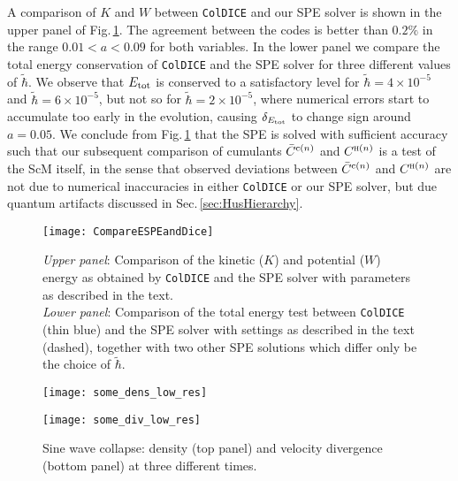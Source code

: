 \documentclass[twocolumn, nofootinbib, showpacs, superscriptaddress]{revtex4-1}
\renewcommand{\H}[0]{{\textsc{h}}}
\newcommand{\thbar}{\tilde\hbar}
\renewcommand{\c}[0]{{\rm{c}}}
\begin{document}
A comparison of $K$ and $W$ between \texttt{ColDICE} and our SPE solver is shown in the upper panel of Fig.\,\ref{fig:CompareESPEandDice}.
The agreement between the codes  is better than $0.2\%$ in the range $0.01<a<0.09$ for both variables.
In the lower panel we compare the total energy conservation of \texttt{ColDICE} and the SPE solver for three different values of $\thbar$. 
We observe that $E_{\rm tot}$ is conserved to a satisfactory level for $\thbar = 4\times10^{-5}$ and $\thbar = 6\times10^{-5}$, but not so for $\thbar = 2\times10^{-5}$, where numerical 
errors start to accumulate too early in the evolution, causing $\delta_{ E_{\rm tot}}$ to change sign around $a=0.05$.
We conclude from Fig.\,\ref{fig:CompareESPEandDice} that the SPE is solved with sufficient accuracy such that our subsequent comparison 
of cumulants $\bar C^{\c (n)}$ and $ C^{\H (n)}$ is a test of the ScM itself, in the sense that observed 
deviations between $\bar C^{\c (n)}$ and $ C^{\H (n)}$ are not due to numerical inaccuracies in either \texttt{ColDICE} or our 
SPE solver, but due quantum artifacts discussed in Sec.\,\ref{sec:HusHierarchy}.

\begin{figure}[t]
    \centering
    \texttt{[image: CompareESPEandDice]}
    \caption{ {\it Upper panel}: Comparison of the kinetic ($K$) and potential ($W$) energy as obtained by \texttt{ColDICE} and the SPE solver with parameters as described in the text. 
 \\
    {\it Lower panel}: Comparison of the total energy test between \texttt{ColDICE} (thin blue) and the SPE solver with settings as described in the text (dashed), together with two other SPE solutions which differ only be the choice of $\thbar$.}
    \label{fig:CompareESPEandDice}
\end{figure} 
  


\FloatBarrier
\begin{figure*}[!]
\texttt{[image: some\_dens\_low\_res]}

\vspace{-0.27cm}

\texttt{[image: some\_div\_low\_res]}
\caption{Sine wave collapse: density (top panel) and velocity divergence (bottom panel) at three different times.}
\label{fig:alldensdiv}
\end{figure*}
\end{document}
